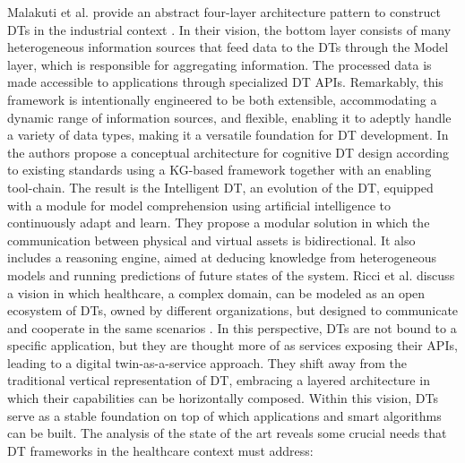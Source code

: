 Malakuti et al. provide an abstract four-layer architecture pattern to construct DTs in the industrial
context \cite{malakuti_four-layer_2019}. In their vision, the bottom layer consists of many heterogeneous information sources that feed data to the DTs through the Model layer, which is responsible for aggregating information. The processed data is made accessible to applications through specialized DT APIs. Remarkably, this framework is intentionally engineered to be both extensible, accommodating a dynamic range of information sources, and flexible, enabling it to adeptly handle a variety of data types, making it a versatile foundation for DT development.
In \cite{jinzhi_exploring_2022} the authors propose a conceptual architecture for cognitive DT design according to existing standards using a KG-based framework together with an enabling tool-chain. The result is the Intelligent DT, an evolution of the DT, equipped with a module for model comprehension using artificial intelligence to continuously adapt and learn. They propose a modular solution in which the communication between physical and virtual assets is bidirectional. It also includes a reasoning engine, aimed at deducing knowledge from heterogeneous models and running predictions of future states of the system.
Ricci et al. discuss a vision in which healthcare, a complex domain, can be modeled as an open ecosystem of DTs, owned by different organizations, but designed to communicate and cooperate in the same scenarios \cite{ricci_web_2022}. In this perspective, DTs are not bound to a specific application, but they are thought more of as services exposing their APIs, leading to a digital twin-as-a-service approach. They shift away from the traditional vertical representation of DT, embracing a layered architecture in which their capabilities can be horizontally composed. Within this vision, DTs serve as a stable foundation on top of which applications and smart algorithms can be built.
The analysis of the state of the art reveals some crucial needs that DT frameworks in the healthcare context must address:

